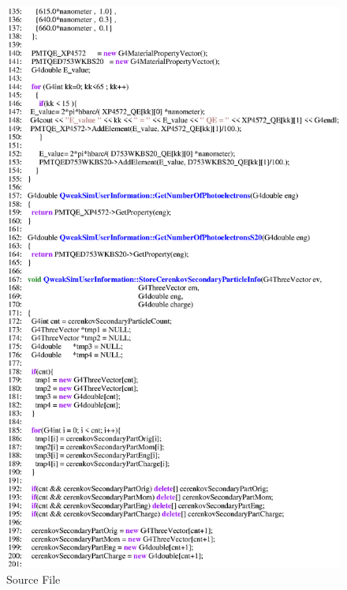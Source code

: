 \begin{figure}[h]
  \hspace{0cm}
  \includegraphics[scale=0.8]{./figures18/QweakSimUserInformation.cc-p3.eps}
  \caption{\label{SourceXVIII5} Source File}
           \label{fig:XVIII-SC-5}
\end{figure}
\clearpage

